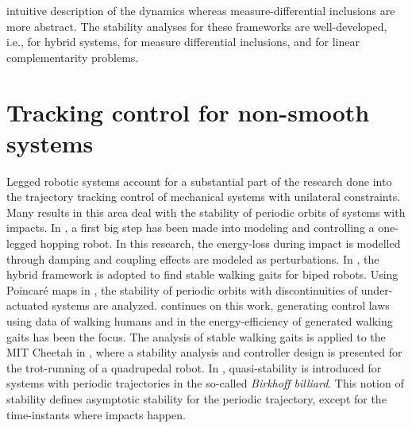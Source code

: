 \documentclass[../DC2017114Bouma.tex]{subfiles}
\begin{document}
intuitive description of the dynamics whereas measure-differential inclusions are more abstract. The stability analyses for these frameworks are well-developed, i.e., \cite{Ye1998,Lygeros2003,Goebel2009} for hybrid systems, \cite{Pereira2004,Brogliato2004,Leine2008} for measure differential inclusions, and \cite{Brogliato1999,Camlibel2006,Camlibel2007} for linear complementarity problems.

\section{Tracking control for non-smooth systems}
Legged robotic systems account for a substantial part of the research done into the trajectory tracking control of mechanical systems with unilateral constraints. Many results in this area deal with the stability of periodic orbits of systems with impacts. In \cite{Raibert1984}, a first big step has been made into modeling and controlling a one-legged hopping robot. In this research, the energy-loss during impact is modelled through damping and coupling effects are modeled as perturbations. In \cite{Grizzle2001}, the hybrid framework is adopted to find stable walking gaits for biped robots. Using Poincar\'{e} maps in \cite{Parker1989}, the stability of periodic orbits with discontinuities of under-actuated systems are analyzed. \cite{Ames2014} continues on this work, generating control laws using data of walking humans and in \cite{Reher2016} the energy-efficiency of generated walking gaits has been the focus. The analysis of stable walking gaits is applied to the MIT Cheetah in \cite{Hyun2014}, where a stability analysis and controller design is presented for the trot-running of a quadrupedal robot. In \cite{Menini2001,Galeani2008}, quasi-stability is introduced for systems with periodic trajectories in the so-called \textit{Birkhoff billiard}. This notion of stability defines asymptotic stability for the periodic trajectory, except for the time-instants where impacts happen.
  
\end{document}
